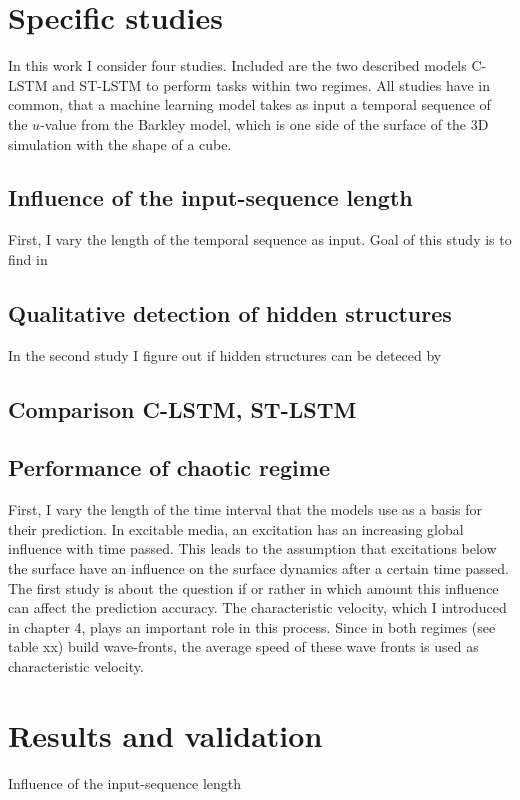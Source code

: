 \section{Specific studies}
In this work I consider four studies. Included are the two described models C-LSTM and ST-LSTM to perform tasks within two regimes. All studies have in common, that a machine learning model takes as input a temporal sequence of the $u$-value from the Barkley model, which is one side of the surface of the 3D simulation with the shape of a cube.

\subsection{Influence of the input-sequence length}
First, I vary the length of the temporal sequence as input. Goal of this study is to find in 

\subsection{Qualitative detection of hidden structures}
In the second study I figure out if hidden structures can be deteced by 
\subsection{Comparison C-LSTM, ST-LSTM}
\subsection{Performance of chaotic regime}

First, I vary the length of the time interval that the models use as a basis for their prediction. In excitable media, an excitation has an increasing global influence with time passed. This leads to the assumption that excitations below the surface have an influence on the surface dynamics after a certain time passed. The first study is about the question if or rather in which amount this influence can affect the prediction accuracy. The characteristic velocity, which I introduced in chapter 4, plays an important role in this process. Since in both regimes (see table xx) build wave-fronts, the average speed of these wave fronts is used as characteristic velocity. 

\section{Results and validation}
Influence of the input-sequence length

